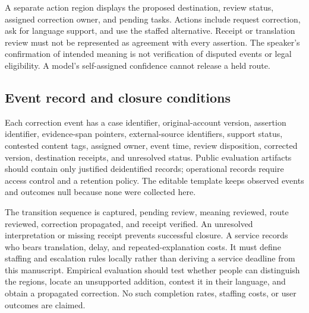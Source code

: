\documentclass[manuscript,screen,review,anonymous]{acmart}
\begin{document}
A separate action region displays the proposed destination, review status, assigned correction owner, and pending tasks. Actions include request correction, ask for language support, and use the staffed alternative. Receipt or translation review must not be represented as agreement with every assertion. The speaker's confirmation of intended meaning is not verification of disputed events or legal eligibility. A model's self-assigned confidence cannot release a held route.

\subsection{Event record and closure conditions}

Each correction event has a case identifier, original-account version, assertion identifier, evidence-span pointers, external-source identifiers, support status, contested content tags, assigned owner, event time, review disposition, corrected version, destination receipts, and unresolved status. Public evaluation artifacts should contain only justified deidentified records; operational records require access control and a retention policy. The editable template keeps observed events and outcomes null because none were collected here.

The transition sequence is captured, pending review, meaning reviewed, route reviewed, correction propagated, and receipt verified. An unresolved interpretation or missing receipt prevents successful closure. A service records who bears translation, delay, and repeated-explanation costs. It must define staffing and escalation rules locally rather than deriving a service deadline from this manuscript. Empirical evaluation should test whether people can distinguish the regions, locate an unsupported addition, contest it in their language, and obtain a propagated correction. No such completion rates, staffing costs, or user outcomes are claimed.
\end{document}
